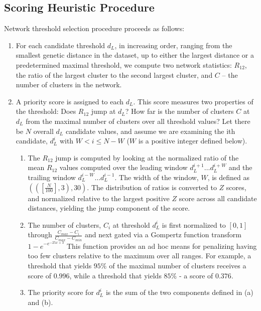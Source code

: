 \documentclass[utf8]{FrontiersinHarvard} %
\begin{document}
\subsection{Scoring Heuristic Procedure}

Network threshold selection procedure proceeds as follows:

\begin{enumerate}
  \item{For each candidate threshold $d_L$, in increasing order, ranging from the smallest genetic distance in the dataset, up to either the largest distance or a predetermined maximal threshold, we compute two network statistics: $R_{12}$, the ratio of the largest cluster to the second largest cluster, and $C$ – the number of clusters in the network.}

  \item{ A priority score is assigned to each $d_L$. This score measures two properties of the threshold: Does $R_{12}$ jump at $d_L$? How far is the number of clusters $C$ at $d_L$ from the maximal number of clusters over all threshold values? Let there be $N$ overall $d_L$ candidate values, and assume we are examining the ith candidate, $d_L^i$ with $W < i \leq N - W$ ($W$ is a positive integer defined below).

  \begin{enumerate}
    \item{The $R_{12}$ jump is computed by looking at the normalized ratio of the mean $R_{12}$ values computed over the leading window $d_L^{i+1}…d_L^{i+W}$ and the trailing window $d_L^{i-W}… d_L^{i-1}$. The width of the window, $W$, is defined as $(([\frac{N}{100}],3),30)$. The distribution of ratios is converted to $Z$ scores, and normalized relative to the largest positive $Z$ score across all candidate distances, yielding the jump component of the score.}
    \item{The number of clusters, $C_i$ at threshold $d_L^i$ is first normalized to $[0,1]$ through $\frac{{C_{max} - C_i}}{{C_{max} -C_{min}}}$ and next gated via a Gompertz function transform ${1-e}^{-e^{-25x+3}}$ This function provides an ad hoc means for penalizing having too few clusters relative to the maximum over all ranges. For example, a threshold that yields $95\%$ of the maximal number of clusters receives a score of $0.996$, while a threshold that yields $85\%$ - a score of $0.376$.}
    \item{The priority score for $d_L^i$ is the sum of the two components defined in (a) and (b).}
  \end{enumerate}}



\end{enumerate}
\end{document}
